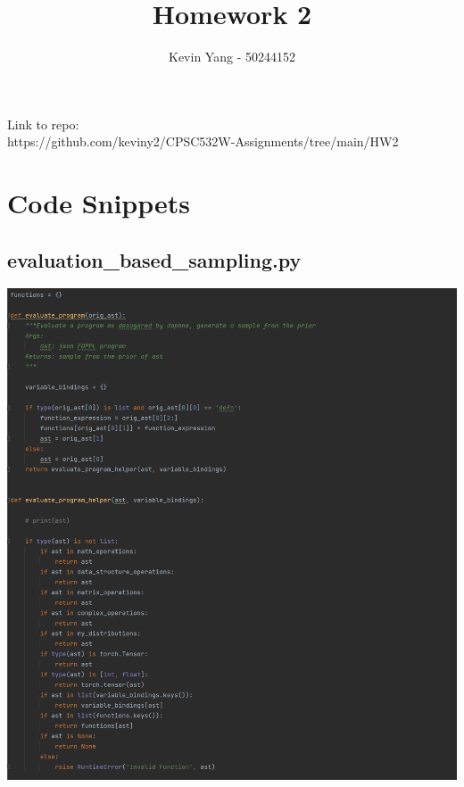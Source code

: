 \documentclass[10pt]{homeworg}
\title{Homework 2}
\author{Kevin Yang - 50244152}
\begin{document}
\maketitle

\Huge{Link to repo:}\\
\Large{https://github.com/keviny2/CPSC532W-Assignments/tree/main/HW2}


\section{Code Snippets}
\subsection{evaluation\_based\_sampling.py}

\begin{center}
\includegraphics[scale=0.5]{figures/evaluate_program_1.png}
\end{center}
\end{document}
